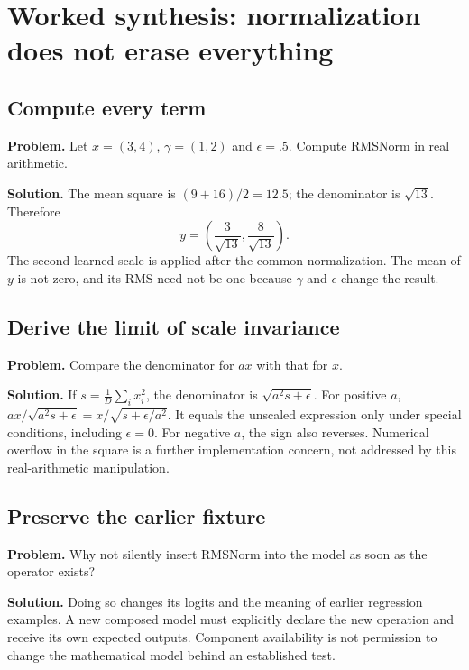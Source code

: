 \section{Worked synthesis: normalization does not erase everything}
\subsection{Compute every term}
\textbf{Problem.} Let $x=(3,4)$, $\gamma=(1,2)$ and $\epsilon=.5$.
Compute RMSNorm in real arithmetic.

\textbf{Solution.} The mean square is $(9+16)/2=12.5$; the denominator is
$\sqrt{13}$. Therefore
\begin{equation}
y=\left(\frac3{\sqrt{13}},\frac8{\sqrt{13}}\right).
\end{equation}
The second learned scale is applied after the common normalization. The
mean of $y$ is not zero, and its RMS need not be one because $\gamma$ and
$\epsilon$ change the result.

\subsection{Derive the limit of scale invariance}
\textbf{Problem.} Compare the denominator for $ax$ with that for $x$.

\textbf{Solution.} If $s=\frac1D\sum_i x_i^2$, the denominator is
$\sqrt{a^2s+\epsilon}$. For positive $a$,
$ax/\sqrt{a^2s+\epsilon}=x/\sqrt{s+\epsilon/a^2}$.
It equals the unscaled expression only under special conditions, including
$\epsilon=0$. For negative $a$, the sign also reverses. Numerical overflow in
the square is a further implementation concern, not addressed by this
real-arithmetic manipulation.

\subsection{Preserve the earlier fixture}
\textbf{Problem.} Why not silently insert RMSNorm into the  model
as soon as the operator exists?

\textbf{Solution.} Doing so changes its logits and the meaning of earlier
regression examples. A new composed model must explicitly declare the new
operation and receive its own expected outputs. Component availability is
not permission to change the mathematical model behind an established test.
